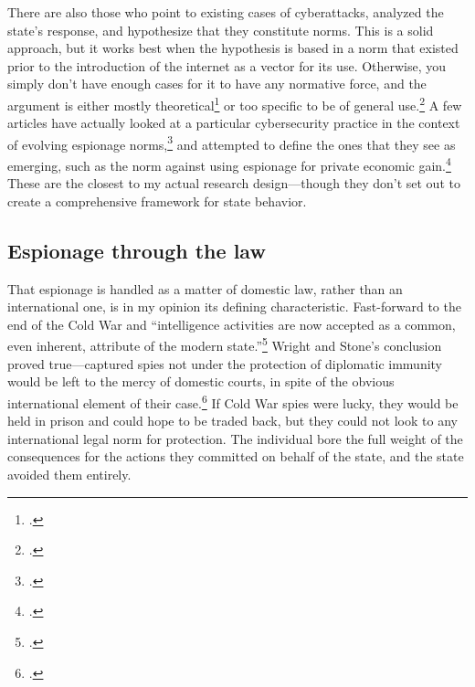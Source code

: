 \documentclass{memoir}
\begin{document}
\begin{refsegment}
There are also those who point to existing cases of cyberattacks, analyzed the state's response, and hypothesize that they constitute norms. This is a solid approach, but it works best when the hypothesis is based in a norm that existed prior to the introduction of the internet as a vector for its use. Otherwise, you simply don't have enough cases for it to have any normative force, and the argument is either mostly theoretical\footcite{neutze_cyber_2013} or too specific to be of general use.\footcite{caso_rules_2014} A few articles have actually looked at a particular cybersecurity practice in the context of evolving espionage norms,\footcite{libicki_coming_2017} and attempted to define the ones that they see as emerging, such as the norm against using espionage for private economic gain.\footcite{rascoff_norm_2016} These are the closest to my actual research design---though they don't set out to create a comprehensive framework for state behavior.

\subsection{Espionage through the law}

That espionage is handled as a matter of domestic law, rather than an international one, is in my opinion its defining characteristic. Fast-forward to the end of the Cold War and ``intelligence activities are now accepted as a common, even inherent, attribute of the modern state.''\footcite[p.~321]{demarest_espionage_1995} Wright and Stone's conclusion proved true---captured spies not under the protection of diplomatic immunity would be left to the mercy of domestic courts, in spite of the obvious international element of their case.\footcite[p.~330]{demarest_espionage_1995} If Cold War spies were lucky, they would be held in prison and could hope to be traded back, but they could not look to any international legal norm for protection.  The individual bore the full weight of the consequences for the actions they committed on behalf of the state, and the state avoided them entirely.


\end{refsegment}
\end{document}
